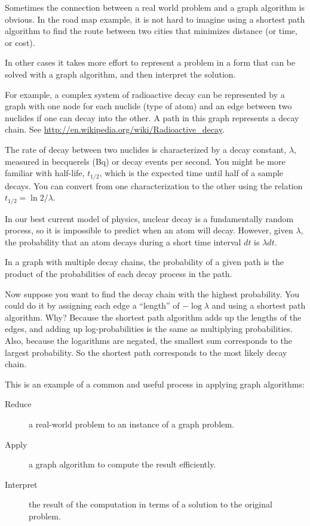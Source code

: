 \documentclass[10pt]{book}
\begin{document}
Sometimes the connection between a real world problem and
a graph algorithm is obvious.  In the road map example, it is
not hard to imagine using a shortest path algorithm to find
the route between two cities that minimizes distance (or time,
or cost).

In other cases it takes more effort to represent a problem in a form
that can be solved with a graph algorithm, and then interpret the
solution.

For example, a complex system of radioactive decay
can be represented by a
graph with one node for each nuclide (type of atom) and an edge
between two nuclides if one can decay into the other.  A path in this
graph represents a decay chain.
See \url{http://en.wikipedia.org/wiki/Radioactive_decay}.

The rate of decay between two nuclides is characterized by a decay
constant, $\lambda$, measured in becquerels (Bq) or decay events per
second.  You might be more familiar with half-life, $t_{1/2}$, which
is the expected time until half of a sample decays.  You can convert
from one characterization to the other using the relation $t_{1/2} =
\ln 2 / \lambda$.

In our best current model of physics, nuclear decay is a fundamentally
random process, so it is impossible to predict when an atom will
decay.  However, given $\lambda$, the probability that an atom
decays during a short time interval $dt$ is $\lambda dt$.

In a graph with multiple decay chains, the probability of a
given path is the product of the probabilities of each decay
process in the path.

Now suppose you want to find the decay chain with the highest
probability.  You could do it by assigning each edge a ``length'' of
$-\log \lambda$ and using a shortest path algorithm.  Why?  Because the
shortest path algorithm adds up the lengths of the edges, and adding
up log-probabilities is the same as multiplying probabilities.  Also,
because the logarithms are negated, the smallest sum corresponds to
the largest probability.  So the shortest path corresponds to the most
likely decay chain.

This is an example of a common and useful process in applying
graph algorithms:

\begin{description}

\item[Reduce] a real-world problem to an instance of a graph
problem.

\item[Apply] a graph algorithm to compute the result efficiently.

\item[Interpret] the result of the computation in terms of a
solution to the original problem.

\end{description}
\end{document}
